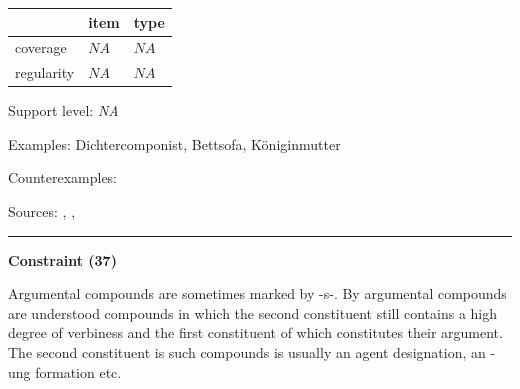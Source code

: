 \vspace{-0.25em}

\begin{table}[!ht]
\begin{center}
\setlength{\extrarowheight}{1pt}
\begin{tabularx}{\columnwidth}{|X|X|X|}
\hline
 & item & type \\
\hline
 coverage & $NA$ & $NA$ \\
\hline
 regularity & $NA$ & $NA$ \\
\hline
\end{tabularx}
\end{center}
\end{table}

\vspace{-1.35em}

\noindent
Support level: \textit{NA}

\vspace{0.3em}

\noindent
Examples: Dichter{\zeroLinker}componist, Bett{\zeroLinker}sofa, Königin{\zeroLinker}mutter

\noindent
Counterexamples: 

\vspace{0.3em}

\noindent
Sources: \citet[63, 64]{koliopoulou_2014}, \citet[31, 32]{neef_borgwaldt_2012}, \citet[57, 91, 94, 109]{ortner_mueller-bollhagen_1991}

\vspace{0.35em}
\hrule




\vspace{0.4em}

\begin{center}
\textbf{Constraint (37)}
\end{center}

\noindent
Argumental compounds are sometimes marked by -s-. By argumental compounds are understood compounds in which the second constituent still contains a high degree of verbiness and the first constituent of which constitutes their argument. The second constituent is such compounds is usually an agent designation, an -ung formation etc.
\vspace{0.5em}


